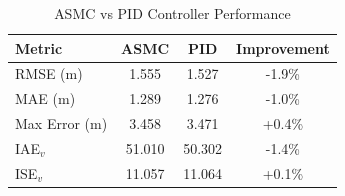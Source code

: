 \begin{table}[h]
\centering
\caption{ASMC vs PID Controller Performance}
\label{tab:asmc_pid}
\begin{tabular}{lccc}
\toprule
\textbf{Metric} & \textbf{ASMC} & \textbf{PID} & \textbf{Improvement} \\
\midrule
RMSE (m) & 1.555 & 1.527 & -1.9\% \\
MAE (m) & 1.289 & 1.276 & -1.0\% \\
Max Error (m) & 3.458 & 3.471 & +0.4\% \\
IAE$_v$ & 51.010 & 50.302 & -1.4\% \\
ISE$_v$ & 11.057 & 11.064 & +0.1\% \\
\bottomrule
\end{tabular}
\end{table}

